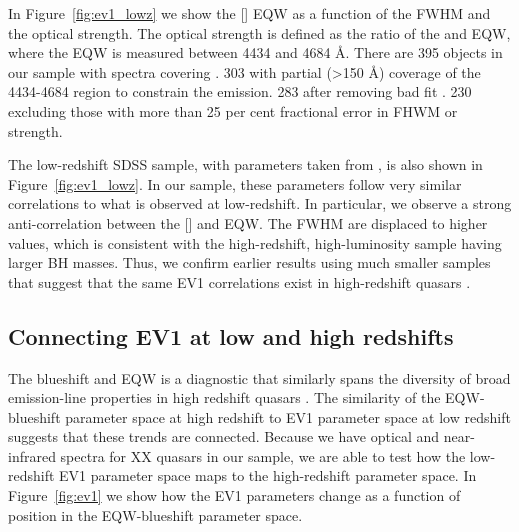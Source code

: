 In Figure~\ref{fig:ev1_lowz} we show the [] EQW as a function of the \hb FWHM and the optical  strength. 
The optical  strength is defined as the ratio of the  and \hb EQW, where the  EQW is measured between 4434 and 4684 \AA.
There are 395 objects in our sample with spectra covering \hb. 
303 with partial (>150 \AA) coverage of the 4434-4684 region to constrain the  emission.
283 after removing bad fit . 
230 excluding those with more than 25 per cent fractional error in \hb FHWM or  strength. 

The low-redshift SDSS sample, with parameters taken from \citet{shen11}, is also shown in Figure~\ref{fig:ev1_lowz}.
In our sample, these parameters follow very similar correlations to what is observed at low-redshift.
In particular, we observe a strong anti-correlation between the [] and  EQW.  
The \hb FWHM are displaced to higher values, which is consistent with the high-redshift, high-luminosity sample having larger BH masses. 
Thus, we confirm earlier results using much smaller samples that suggest that the same EV1 correlations exist in high-redshift quasars \citep[e.g.][]{netzer04,sulentic04,sulentic06,runnoe13,shen16a}.

\subsection{Connecting EV1 at low and high redshifts}
\label{sec:ch4_low_high_ev1}

The  blueshift and EQW is a diagnostic that similarly spans the diversity of broad emission-line properties in high redshift quasars \citep{sulentic07,richards11}. 
The similarity of the  EQW-blueshift parameter space at high redshift to EV1 parameter space at low redshift suggests that these trends are connected. 
Because we have optical and near-infrared spectra for XX quasars in our sample, we are able to test how the low-redshift EV1 parameter space maps to the high-redshift  parameter space.
In Figure~\ref{fig:ev1} we show how the EV1 parameters change as a function of position in the  EQW-blueshift parameter space.

